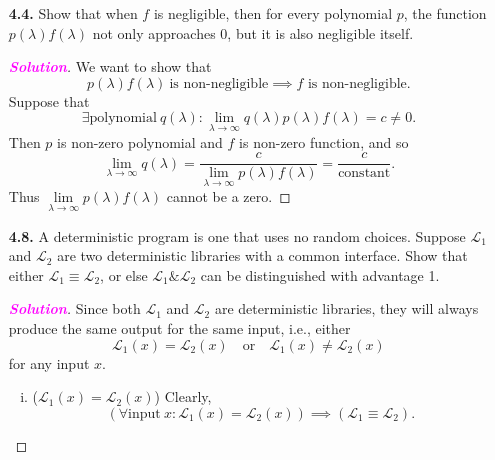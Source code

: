 \documentclass[12pt,openany]{book}
\theoremstyle{definition}
\newcommand{\ie}{\textnormal{i.e.}}
\newcommand{\sol}{\textcolor{magenta}{\bf Solution}}
\newcommand{\library}{\mathcal{L}}
\begin{document}
\begin{itemize}
\begin{proof}[\sol]
\begin{enumerate}[(1)]
\begin{figure}[h!]
			\end{figure}
		\end{enumerate}
		\end{proof}
		\item[\bf 4.4.] Show that when $f$ is negligible, then for every polynomial $p$, the function $p(\lambda)f(\lambda)$ not only approaches $0$, but it is also negligible itself.
			\begin{proof}[\sol]
				We want to show that \[
				p(\lambda)f(\lambda)\ \text{is non-negligible}\implies\text{$f$ is non-negligible}.
				\] Suppose that \[
				\exists\text{polynomial}\ q(\lambda):\lim\limits_{\lambda\to\infty}q(\lambda)p(\lambda)f(\lambda)=c\neq0.
				\] Then \(p\) is non-zero polynomial and $f$ is non-zero function, and so \[
				\lim\limits_{\lambda\to\infty} q(\lambda)=\frac{c}{\lim\limits_{\lambda\to\infty}p(\lambda)f(\lambda)}=\frac{c}{\text{constant}}.
				\] Thus \(\lim\limits_{\lambda\to\infty}p(\lambda)f(\lambda)\) cannot be a zero.
			\end{proof}
		\vspace{8pt}
		\item[\bf 4.8.] A deterministic program is one that uses no random choices. Suppose $\library_{1}$ and $\library_{2}$ are two deterministic libraries with a common interface. Show that either $\library_{1}\equiv\library_{2}$, or else $\library_{1}\&\library_{2}$ can be distinguished with advantage 1.
			\begin{proof}[\sol]
				Since both \(\library_{1}\) and \(\library_{2}\) are deterministic libraries,  they will always produce the same output for the same input, \ie, either \[
				\library_{1}(x)=\library_{2}(x)\quad\text{or}\quad \library_{1}(x)\neq\library_{2}(x)
				\] for any input \(x\).
				\begin{enumerate}[(i)]
					\item ($\library_{1}(x)=\library_{2}(x)$) Clearly, \[
					(\forall\text{input}\ x:\library_{1}(x)=\library_{2}(x)) \implies(\library_{1}\equiv\library_{2}).
\]
\end{enumerate}
\end{proof}
\end{itemize}
\end{document}
